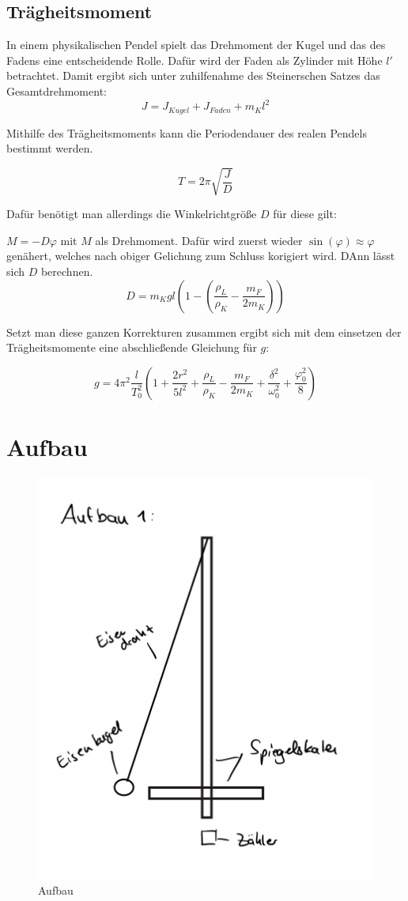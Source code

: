 \subsection{Trägheitsmoment}

In einem physikalischen Pendel spielt das Drehmoment der Kugel und das des Fadens eine entscheidende Rolle.
Dafür wird der Faden als Zylinder mit Höhe $l'$ betrachtet. Damit ergibt sich unter zuhilfenahme des Steinerschen Satzes das Gesamtdrehmoment:
\begin{equation}
    J = J_{Kugel} + J_ {Faden} + m_K l^2
\end{equation}

Mithilfe des Trägheitsmoments kann die Periodendauer des realen Pendels bestimmt werden.

\begin{equation}
    T = 2 \pi \sqrt{\frac{J}{D}}
\end{equation}

Dafür benötigt man allerdings die Winkelrichtgröße $D$ für diese gilt:

$M = -D \varphi$
mit $M$ als Drehmoment.
Dafür wird zuerst wieder $\sin(\varphi) \approx \varphi$ genähert, welches nach obiger Gelichung zum Schluss korigiert wird.
DAnn lässt sich $D$ berechnen.
\begin{equation}
    D = m_K g l \left( 1 - \left(\frac{\rho_L}{\rho_K}- \frac{m_F}{2 m_K}\right)\right)
\end{equation}

Setzt man diese ganzen Korrekturen zusammen ergibt sich mit dem einsetzen der Trägheitsmomente eine abschließende Gleichung für $g$:

\begin{equation}
    g = 4 \pi^2 \frac{l}{T_0^2}\left(1 + \frac{2 r^2}{5l^2}+  \frac{\rho_L}{\rho_K}- \frac{m_F}{2 m_K} + \frac{\delta^2}{\omega_0 ^2} +\frac{\varphi_0^2}{8}\right)
    \label{eq:leckmich}
\end{equation}
\newpage
\section{Aufbau}

\begin{figure}[h!]
    \centering
    \includegraphics[width = .5\textwidth]{JPEG image-433E-B9B9-77-0.jpeg}
    \caption{Aufbau}
\end{figure}
\clearpage
